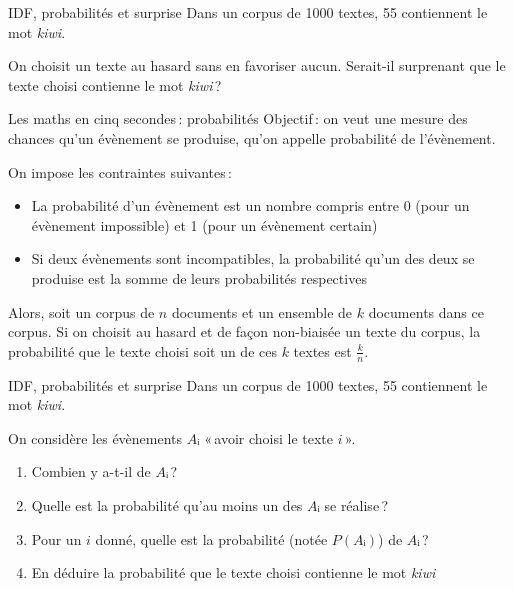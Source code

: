 \documentclass[../allslides.tex]{subfiles}
\begin{document}

\begin{frame}{IDF, probabilités et surprise}
	Dans un corpus de \num{1000} textes, \num{55} contiennent le mot \emph{kiwi}.
	\pause

	On choisit un texte au hasard sans en favoriser aucun. Serait-il surprenant que le texte choisi contienne le mot \emph{kiwi} ?
\end{frame}

\begin{frame}{Les maths en cinq secondes : probabilités}
	Objectif : on veut une \alert{mesure} des chances qu'un évènement se produise, qu'on appelle \alert{probabilité} de l'évènement.
	
	\pause
	On impose les contraintes suivantes :
	\begin{itemize}
		\item La probabilité d'un évènement est un nombre compris entre \num{0} (pour un évènement impossible) et \num{1} (pour un évènement certain)
		\item Si deux évènements sont \alert{incompatibles}, la probabilité qu'un des deux se produise est la somme de leurs probabilités respectives
	\end{itemize}
	\itpause
	Alors, soit un corpus de \(n\) documents et un ensemble de \(k\) documents dans ce corpus.
	Si on choisit au hasard et de façon non-biaisée un texte du corpus, la probabilité que le texte choisi soit un de ces \(k\) textes est \(\frac{k}{n}\).
\end{frame}

\begin{frame}{IDF, probabilités et surprise}
	Dans un corpus de \num{1000} textes, \num{55} contiennent le mot \emph{kiwi}.
	
	On considère les évènements \(Aᵢ\) « avoir choisi le texte \(i\) ».
	\pause
	\begin{enumerate}
		\item Combien y a-t-il de \(Aᵢ\) ?  \only<3->{→ \num{1000}}
		\item Quelle est la probabilité qu'au moins un des \(Aᵢ\) se réalise ?  \only<4->{→ \num{1}}
		\item Pour un \(i\) donné, quelle est la probabilité (notée \(P(Aᵢ)\)) de \(Aᵢ\) ?  \only<5->{→ \(\frac{1}{1000}\)}
		\item En déduire la probabilité que le texte choisi contienne le mot \emph{kiwi}  \only<6->{→ \(\frac{55}{1000}\)}
	\end{enumerate}
\end{frame}
\end{document}
